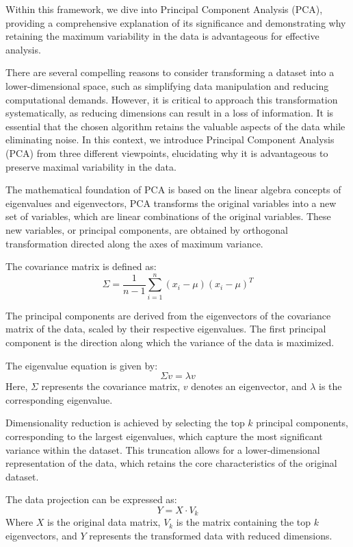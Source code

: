 \documentclass[sigconf]{acmart}
\begin{document}
Within this framework, we dive into Principal Component Analysis (PCA), providing a comprehensive explanation of its significance and demonstrating why retaining the maximum variability in the data is advantageous for effective analysis.

There are several compelling reasons to consider transforming a dataset into a lower-dimensional space, such as simplifying data manipulation and reducing computational demands. However, it is critical to approach this transformation systematically, as reducing dimensions can result in a loss of information. It is essential that the chosen algorithm retains the valuable aspects of the data while eliminating noise. In this context, we introduce Principal Component Analysis (PCA) from three different viewpoints, elucidating why it is advantageous to preserve maximal variability in the data.

The mathematical foundation of PCA is based on the linear algebra concepts of eigenvalues and eigenvectors, PCA transforms the original variables into a new set of variables, which are linear combinations of the original variables. These new variables, or principal components, are obtained by orthogonal transformation directed along the axes of maximum variance.

The covariance matrix is defined as:
\[
\Sigma = \frac{1}{n-1} \sum_{i=1}^{n} (x_i - \mu)(x_i - \mu)^T
\]

The principal components are derived from the eigenvectors of the covariance matrix of the data, scaled by their respective eigenvalues. The first principal component is the direction along which the variance of the data is maximized.

The eigenvalue equation is given by:
\[
\Sigma v = \lambda v
\]
Here, $\Sigma$ represents the covariance matrix, $v$ denotes an eigenvector, and $\lambda$ is the corresponding eigenvalue.


Dimensionality reduction is achieved by selecting the top $k$ principal components, corresponding to the largest eigenvalues, which capture the most significant variance within the dataset. This truncation allows for a lower-dimensional representation of the data, which retains the core characteristics of the original dataset.

The data projection can be expressed as:
\[
Y = X \cdot V_k
\]
Where $X$ is the original data matrix, $V_k$ is the matrix containing the top $k$ eigenvectors, and $Y$ represents the transformed data with reduced dimensions.
\end{document}
